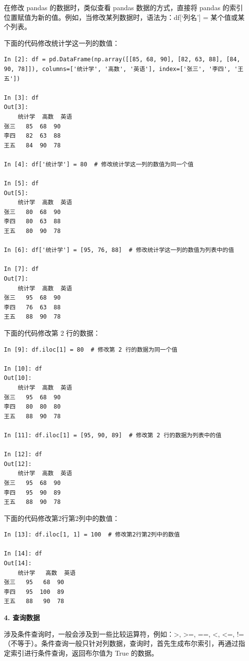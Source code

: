 在修改 pandas 的数据时，类似查看 pandas 数据的方式，直接将 pandas 的索引位置赋值为新的值。例如，当修改某列数据时，语法为：df[`列名'] =  某个值或某个列表。


下面的代码修改统计学这一列的数值：
\begin{lstlisting}[Language=Python]
In [2]: df = pd.DataFrame(np.array([[85, 68, 90], [82, 63, 88], [84, 90, 78]]), columns=['统计学', '高数', '英语'], index=['张三', '李四', '王五'])

In [3]: df
Out[3]:
    统计学  高数  英语
张三   85  68  90
李四   82  63  88
王五   84  90  78

In [4]: df['统计学'] = 80  # 修改统计学这一列的数值为同一个值

In [5]: df
Out[5]:
    统计学  高数  英语
张三   80  68  90
李四   80  63  88
王五   80  90  78

In [6]: df['统计学'] = [95, 76, 88]  # 修改统计学这一列的数值为列表中的值

In [7]: df
Out[7]:
    统计学  高数  英语
张三   95  68  90
李四   76  63  88
王五   88  90  78
\end{lstlisting}

下面的代码修改第 2 行的数据：
\begin{lstlisting}[Language=Python]
In [9]: df.iloc[1] = 80  # 修改第 2 行的数据为同一个值

In [10]: df
Out[10]:
    统计学  高数  英语
张三   95  68  90
李四   80  80  80
王五   88  90  78

In [11]: df.iloc[1] = [95, 90, 89]  # 修改第 2 行的数据为列表中的值

In [12]: df
Out[12]:
    统计学  高数  英语
张三   95  68  90
李四   95  90  89
王五   88  90  78
\end{lstlisting}

下面的代码修改第2行第2列中的数值：

\begin{lstlisting}[Language=Python]
In [13]: df.iloc[1, 1] = 100  # 修改第2行第2列中的数值

In [14]: df
Out[14]:
    统计学   高数  英语
张三   95   68  90
李四   95  100  89
王五   88   90  78
\end{lstlisting}


\vspace{3pt}
\noindent\textbf{4. 查询数据}
\vspace{3pt}

涉及条件查询时，一般会涉及到一些比较运算符，例如：>, >=, ==, <, <=, !=（不等于）。条件查询一般只针对列数据，查询时，首先生成布尔索引，再通过指定索引进行条件查询，返回布尔值为 True 的数据。


